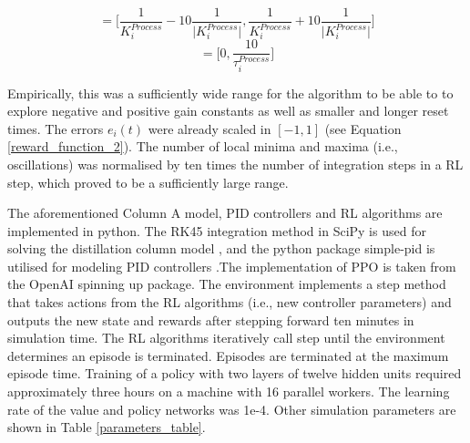 \begin{equation}
	[K_i^{P, low}, K_i^{P, high}] = \Biggl [\frac{1}{ K_i^{Process}}-10 \frac{1}{\vert K_i^{Process} \vert}, \frac{1}{K_i^{Process}}+10 \frac{1}{\vert K_i^{Process} \vert}\Biggr ]
\end{equation}
\begin{equation}
	[K_i^{I, low}, K_i^{I, high}] = \Biggl [0, \frac{10}{ \tau_i^{Process}}\Biggr ]
\end{equation}

Empirically, this was a sufficiently wide range for the algorithm to be able to to explore negative and positive gain constants as well as smaller and longer reset times. The errors $e_i(t)$ were already scaled in  $[-1, 1]$ (see Equation \ref{reward_function_2}). The number of local minima and maxima (i.e., oscillations) was normalised by ten times the number of integration steps in a RL step, which proved to be a sufficiently large range. 
 
The aforementioned Column A model, PID controllers and RL algorithms are implemented in python. The RK45 integration method in SciPy is used for solving the distillation column model \cite{2020SciPy-NMeth}, and the python package simple-pid is utilised for modeling PID controllers \cite{Lundberg2019}.The implementation of PPO is taken from the OpenAI spinning up package. The environment implements a step method that takes actions from the RL algorithms (i.e., new controller parameters) and outputs the new state and rewards after stepping forward ten minutes in simulation time. The RL algorithms iteratively call step until the environment determines an episode is terminated. Episodes are terminated at the maximum episode time. Training of a policy with two layers of twelve hidden units required approximately three hours on a machine with 16 parallel workers. The learning rate of the value and policy networks was 1e-4. Other simulation parameters are shown in Table \ref{parameters_table}.

